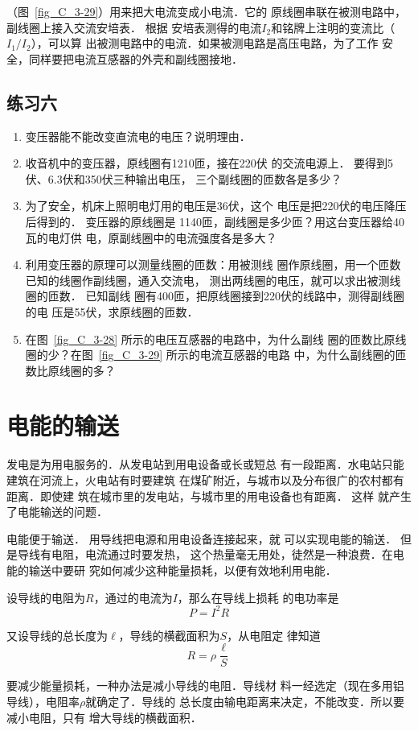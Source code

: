 （图~\ref{fig_C_3-29}）用来把大电流变成小电流．它的
原线圈串联在被测电路中，副线圈上接入交流安培表．
根据
安培表测得的电流$I_2$和铭牌上注明的变流比（$I_1/I_2$），可以算
出被测电路中的电流．如果被测电路是高压电路，为了工作
安全，同样要把电流互感器的外壳和副线圈接地．

\subsection*{练习六}
\begin{enumerate}
    \item 变压器能不能改变直流电的电压？说明理由．
    \item 收音机中的变压器，原线圈有1210匝，接在220伏
的交流电源上．
要得到5伏、6.3伏和350伏三种输出电压，
三个副线圈的匝数各是多少？
\item 为了安全，机床上照明电灯用的电压是36伏，这个
电压是把220伏的电压降压后得到的．
变压器的原线圈是
1140匝，副线圈是多少匝？用这台变压器给40瓦的电灯供
电，原副线圈中的电流强度各是多大？
\item 利用变压器的原理可以测量线圈的匝数：用被测线
圈作原线圈，用一个匝数已知的线圈作副线圈，通入交流电，
测出两线圈的电压，就可以求出被测线圈的匝数．
已知副线
圈有400匝，把原线圈接到220伏的线路中，测得副线圈的电
压是55伏，求原线圈的匝数．
\item 在图~\ref{fig_C_3-28} 所示的电压互感器的电路中，为什么副线
圈的匝数比原线圈的少？在图~\ref{fig_C_3-29} 所示的电流互感器的电路
中，为什么副线圈的匝数比原线圈的多？
\end{enumerate}

\section{电能的输送}
发电是为用电服务的．从发电站到用电设备或长或短总
有一段距离．水电站只能建筑在河流上，火电站有时要建筑
在煤矿附近，与城市以及分布很广的农村都有距离．即使建
筑在城市里的发电站，与城市里的用电设备也有距离．
这样
就产生了电能输送的问题．

电能便于输送．
用导线把电源和用电设备连接起来，就
可以实现电能的输送．
但是导线有电阻，电流通过时要发热，
这个热量毫无用处，徒然是一种浪费．在电能的输送中要研
究如何减少这种能量损耗，以便有效地利用电能．

设导线的电阻为$R$，通过的电流为$I$，那么在导线上损耗
的电功率是
\[P=I^2R \]

又设导线的总长度为$\ell$，导线的横截面积为$S$，从电阻定
律知道
\[ R=\rho\frac{\ell}{S}\]

要减少能量损耗，一种办法是减小导线的电阻．导线材
料一经选定（现在多用铝导线），电阻率$\rho$就确定了．导线的
总长度由输电距离来决定，不能改变．所以要减小电阻，只有
增大导线的横截面积．

